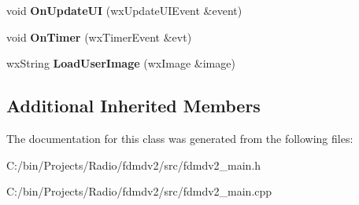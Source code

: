 \begin{DoxyCompactItemize}
\item 
\hypertarget{class_main_frame_a4757c5d7d0e9b2c98dc34336f1dce49e}{void {\bfseries On\-Update\-U\-I} (wx\-Update\-U\-I\-Event \&event)}\label{class_main_frame_a4757c5d7d0e9b2c98dc34336f1dce49e}

\item 
\hypertarget{class_main_frame_a9ad22e55c7a3c93f9c071d366ae760d6}{void {\bfseries On\-Timer} (wx\-Timer\-Event \&evt)}\label{class_main_frame_a9ad22e55c7a3c93f9c071d366ae760d6}

\item 
\hypertarget{class_main_frame_a2577b78ec0105922e5356287519d2e54}{wx\-String {\bfseries Load\-User\-Image} (wx\-Image \&image)}\label{class_main_frame_a2577b78ec0105922e5356287519d2e54}

\end{DoxyCompactItemize}
\subsection*{Additional Inherited Members}


The documentation for this class was generated from the following files\-:\begin{DoxyCompactItemize}
\item 
C\-:/bin/\-Projects/\-Radio/fdmdv2/src/fdmdv2\-\_\-main.\-h\item 
C\-:/bin/\-Projects/\-Radio/fdmdv2/src/fdmdv2\-\_\-main.\-cpp\end{DoxyCompactItemize}
